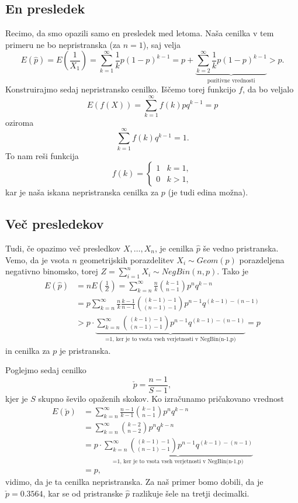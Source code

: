 \documentclass[a4paper,12pt]{article}
\begin{document}
\subsection{En presledek}
Recimo, da smo opazili samo en presledek med letoma. Naša cenilka v tem primeru ne bo nepristranska (za $n=1$), saj velja
\begin{equation*}
    E(\widehat{p}) = E\left(\frac{1}{X_1}\right) = \sum_{k=1}^{\infty}\frac{1}{k}p(1-p)^{k-1} = 
    p + \underbrace{\sum_{k=2}^{\infty}\frac{1}{k}p(1-p)^{k-1}}_\text{pozitivne vrednosti} > p.
\end{equation*}
Konstruirajmo sedaj nepristransko cenilko. Iščemo torej funkcijo $f$, da bo veljalo
\begin{equation*}
    E(f(X)) = \sum_{k=1}^{\infty}f(k)pq^{k-1} = p
\end{equation*}
oziroma
\begin{equation*}
    \sum_{k=1}^{\infty}f(k)q^{k-1} = 1.
\end{equation*}
To nam reši funkcija
\begin{equation*}
    f(k) = \begin{cases}
        1  &  k =1, \\
        0 & k >1,
    \end{cases}
\end{equation*}
kar je naša iskana nepristranska cenilka za $p$ (je tudi edina možna).
%
%
\subsection{Več presledekov}
Tudi, če opazimo več presledkov $X, \ldots, X_n$, je cenilka $\widehat{p}$  še vedno pristranska. Vemo, da je vsota $n$ geometrijskih porazdelitev 
$X_i \sim Geom(p)$ porazdeljena negativno binomsko, torej $Z = \sum_{i=1}^{n}X_i \sim NegBin(n,p)$. Tako je
\begin{align*}
    E(\widehat{p}) &= nE\left(\frac{1}{Z}\right)= \sum_{k=n}^{\infty}\frac{n}{k}\binom{k-1}{n-1}p^nq^{k-n}\\
    &= p\sum_{k=n}^{\infty}\frac{n}{k}\frac{k-1}{n-1}\binom{(k-1)-1}{(n-1)-1}p^{n-1}q^{(k-1)-(n-1)} \\
    &> p \cdot \underbrace{\sum_{k=n}^{\infty}\binom{(k-1)-1}{(n-1)-1}p^{n-1}q^{(k-1)-(n-1)}}_\text{=1, ker je to vsota vseh verjetnosti v NegBin(n-1,p)} = p
\end{align*}
in cenilka za $p$ je pristranska.

Poglejmo sedaj cenilko 
$$\check{p}=\frac{n-1}{S-1},$$
kjer je $S$ skupno ševilo opaženih skokov.
Ko izračunamo pričakovano vrednost
\begin{align*}
    E(\check{p}) &=  \sum_{k=n}^{\infty}\frac{n-1}{k-1}\binom{k-1}{n-1}p^nq^{k-n} \\
    &= \sum_{k=n}^{\infty}\binom{k-2}{n-2}p^nq^{k-n} \\
    &= p \cdot \underbrace{\sum_{k=n}^{\infty}\binom{(k-1)-1}{(n-1)-1}p^{n-1}q^{(k-1)-(n-1)}}_\text{=1, ker je to vsota vseh verjetnosti v NegBin(n-1,p)} \\
    &= p,
\end{align*}
vidimo, da je ta cenilka nepristranska. Za naš primer bomo dobili, da je $\check{p}=0.3564$, kar se od pristranske $\widehat{p}$ razlikuje 
šele na tretji decimalki.
%
%
%
%
\end{document}
